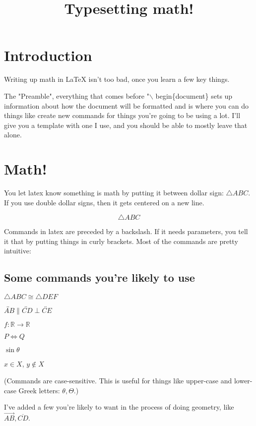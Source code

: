 \documentclass[11pt]{article}
\newcommand{\R}{\ensuremath{\mathbb R}}
\newcommand{\ray}[1]{\overrightarrow{#1}}
\renewcommand{\line}[1]{\overleftrightarrow{#1}}
\newcommand{\segment}[1]{\overline{#1}}
\theoremstyle{definition}
\begin{document}


\title{Typesetting math!}

\maketitle

\section{Introduction}

Writing up math in LaTeX isn't too bad, once you learn a few key things.

The "Preamble", everything that comes before "$\backslash$ begin\{document\} sets up information about how the document will be formatted and is where you can do things like create new commands for things you're going to be using a lot. I'll give you a template with one I use, and you should be able to mostly leave that alone.

\section{Math!}


You let latex know something is math by putting it between dollar sign: $\triangle ABC$. If you use double dollar signs, then it gets centered on a new line.

$$\triangle ABC$$

Commands in latex are preceded by a backslash. If it needs parameters, you tell it that by putting things in curly brackets. Most of the commands are pretty intuitive:

\subsection{Some commands you're likely to use}\label{commands}

$\triangle ABC \cong \triangle DEF$

$\line{AB} \parallel \line{CD} \perp \line{CE}$

$f\colon \R \to \R$

$P \iff Q$

$\sin{\theta}$

$x \in X$, $y \not\in X$

(Commands are case-sensitive. This is useful for things like upper-case and lower-case Greek letters: $\theta, \Theta$.)

I've added a few you're likely to want in the process of doing geometry, like $\ray{AB}, \segment{CD}$.
\end{document}
